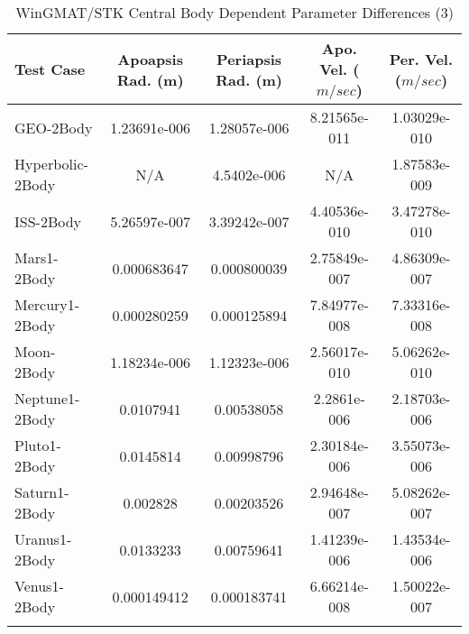\begin{table}[htbp!]
\centering
\caption{ WinGMAT/STK Central Body Dependent Parameter Differences (3)}
      \begin{tabular}{lcccc}
      \hline\hline
          Test Case & Apoapsis Rad. (m) & Periapsis Rad. (m) & Apo. Vel. ($m/sec$) & Per. Vel. ($m/sec$) \\
         \hline
         GEO-2Body & 1.23691e-006 & 1.28057e-006 & 8.21565e-011 & 1.03029e-010 \\
         Hyperbolic-2Body & N/A & 4.5402e-006 & N/A & 1.87583e-009 \\
         ISS-2Body & 5.26597e-007 & 3.39242e-007 & 4.40536e-010 & 3.47278e-010 \\
         Mars1-2Body & 0.000683647 & 0.000800039 & 2.75849e-007 & 4.86309e-007 \\
         Mercury1-2Body & 0.000280259 & 0.000125894 & 7.84977e-008 & 7.33316e-008 \\
         Moon-2Body & 1.18234e-006 & 1.12323e-006 & 2.56017e-010 & 5.06262e-010 \\
         Neptune1-2Body & 0.0107941 & 0.00538058 & 2.2861e-006 & 2.18703e-006 \\
         Pluto1-2Body & 0.0145814 & 0.00998796 & 2.30184e-006 & 3.55073e-006 \\
         Saturn1-2Body & 0.002828 & 0.00203526 & 2.94648e-007 & 5.08262e-007 \\
         Uranus1-2Body & 0.0133233 & 0.00759641 & 1.41239e-006 & 1.43534e-006 \\
         Venus1-2Body & 0.000149412 & 0.000183741 & 6.66214e-008 & 1.50022e-007 \\
      \hline\hline
      \label{Table: WinGMAT-STK CB Parameters Set 3} 
\end{tabular}
\end{table}
